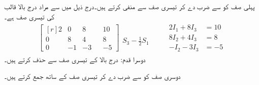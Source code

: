 پہلی صف کو  سے ضرب دے کر تیسری صف سے منفی کرتے ہیں۔درج ذیل میں  سے مراد درج بالا قالب کی تیسری صف
  ہے۔
\begin{gather*}
\begin{bmatrix*}[r]2&0&8&&10\\0&8&4&&8\\
0&-1&-3&&-5  \end{bmatrix*}\begin{matrix} \\ \\ S_3-\frac{1}{2}S_1 \end{matrix} \quad \quad 
\begin{aligned}
2I_1+8I_3&=10\\
8I_2+4I_3&=8\\
-I_2-3I_3&=-5
\end{aligned}
\end{gather*}
دوسرا قدم: درج بالا کے تیسری  صف سے  حذف کرتے ہیں۔

دوسری صف کو  سے ضرب دے کر تیسری  صف کے ساتھ جمع کرتے ہیں۔ 

